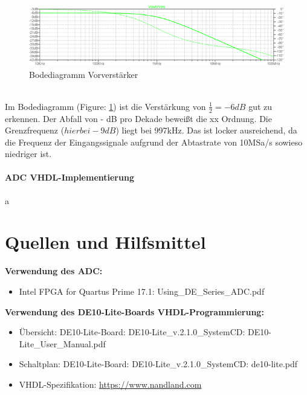 \begin{figure}[!h]
\begin{center}
\includegraphics[width=15cm]{SAUER/Grafiken/ADC_Front-End_Bode.PNG}
\caption{Bodediagramm Vorverstärker}
\label{Front-End_Bode}
\end{center}
\end{figure}
\\Im Bodediagramm (Figure: \ref{Front-End_Bode}) ist die Verstärkung von $\frac{1}{2} = -6dB$ gut zu erkennen. Der Abfall von - dB pro Dekade beweißt die xx Ordnung. Die Grenzfrequenz ($hier bei -9dB$) liegt bei 997kHz. Das ist locker ausreichend, da die Frequenz der Eingangssignale aufgrund der Abtastrate von 10MSa/s sowieso niedriger ist.

\paragraph{ADC VHDL-Implementierung}
a

\section{Quellen und Hilfsmittel}
\textbf{Verwendung des ADC:}
\begin{itemize}
\item Intel FPGA for Quartus Prime 17.1: Using\_DE\_Series\_ADC.pdf
\end{itemize}
\textbf{Verwendung des DE10-Lite-Boards VHDL-Programmierung:}
\begin{itemize}
\item
Übersicht: DE10-Lite-Board: DE10-Lite\_v.2.1.0\_SystemCD: DE10-Lite\_User\_Manual.pdf
\item
\label{Schaltplan_FPGA}
Schaltplan: DE10-Lite-Board: DE10-Lite\_v.2.1.0\_SystemCD: de10-lite.pdf
\item
VHDL-Spezifikation: \url{https://www.nandland.com}
\end{itemize}
